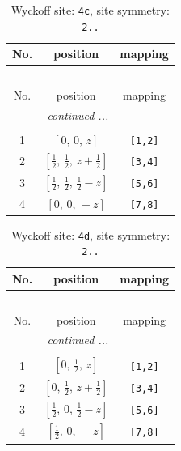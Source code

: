 \documentclass[fleqn,8pt]{jsarticle}
\begin{document}
\renewcommand{\arraystretch}{1.2}
\begin{longtable}{ccc}
\caption{Wyckoff site: {\tt 4c}, site symmetry: {\tt 2..}}
 \\
 \hline \hline
No. & position & mapping \\ \hline \endfirsthead

\multicolumn{2}{l}{\tablename\ \thetable{}} \\
 \hline \hline
No. & position & mapping \\ \hline \endhead

 \hline \hline
\multicolumn{2}{r}{\footnotesize\it continued ...} \\ \endfoot

 \hline \hline
\multicolumn{2}{r}{} \\ \endlastfoot

1 & $\left[ 0,\, 0,\, z \right]$ & {\tt [1,2]} \\ \hline
2 & $\left[ \frac{1}{2},\, \frac{1}{2},\, z + \frac{1}{2} \right]$ & {\tt [3,4]} \\ \hline
3 & $\left[ \frac{1}{2},\, \frac{1}{2},\, \frac{1}{2} - z \right]$ & {\tt [5,6]} \\ \hline
4 & $\left[ 0,\, 0,\, - z \right]$ & {\tt [7,8]} \\
\end{longtable}
\renewcommand{\arraystretch}{1.2}
\begin{longtable}{ccc}
\caption{Wyckoff site: {\tt 4d}, site symmetry: {\tt 2..}}
 \\
 \hline \hline
No. & position & mapping \\ \hline \endfirsthead

\multicolumn{2}{l}{\tablename\ \thetable{}} \\
 \hline \hline
No. & position & mapping \\ \hline \endhead

 \hline \hline
\multicolumn{2}{r}{\footnotesize\it continued ...} \\ \endfoot

 \hline \hline
\multicolumn{2}{r}{} \\ \endlastfoot

1 & $\left[ 0,\, \frac{1}{2},\, z \right]$ & {\tt [1,2]} \\ \hline
2 & $\left[ 0,\, \frac{1}{2},\, z + \frac{1}{2} \right]$ & {\tt [3,4]} \\ \hline
3 & $\left[ \frac{1}{2},\, 0,\, \frac{1}{2} - z \right]$ & {\tt [5,6]} \\ \hline
4 & $\left[ \frac{1}{2},\, 0,\, - z \right]$ & {\tt [7,8]} \\
\end{longtable}
\end{document}
